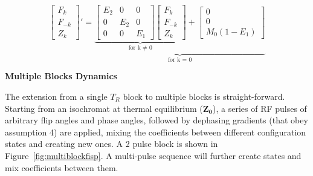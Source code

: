 \begin{equation}\label{eq:woessnerFn}
    \begin{bmatrix}
        F_k      \\
        F_{-k} \\
        Z_k
    \end{bmatrix}' = 
    \underbrace{
    \underbrace{\begin{bmatrix}
        E_2 & 0 & 0 \\
        0 & E_2 & 0 \\
        0 & 0 & E_1 
    \end{bmatrix}
    \begin{bmatrix}
        F_k      \\
        F_{-k} \\
        Z_k
    \end{bmatrix}}_\text{for k $\neq$ 0}
    +
    \begin{bmatrix}
        0 \\
        0 \\
        M_0 (1 - E_1)
    \end{bmatrix}}_\text{for k = 0}
\end{equation}

\hfill

\large \textbf{Multiple Blocks Dynamics} \normalsize 

The extension from a single $T_R$ block to multiple blocks is straight-forward.
Starting from an isochromat at thermal equilibrium ($\bm{Z_0}$), a series of RF pulses of arbitrary flip angles and phase angles, followed by dephasing gradients (that obey assumption 4) are applied, mixing the coefficients between different configuration states and creating new ones.
A 2 pulse block is shown in Figure~\ref{fig:multiblockfisp}.
A multi-pulse sequence will further create states and mix coefficients between them.

